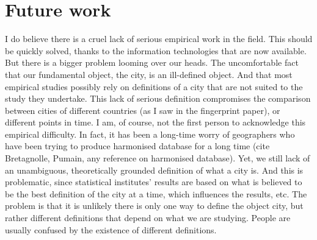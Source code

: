 \section{Future work}
\label{sec:future_work}

I do believe there is a cruel lack of serious empirical work in the field. This
should be quickly solved, thanks to the information technologies that are now
available. But there is a bigger problem looming over our heads. The
uncomfortable fact that our fundamental object, the city, is an ill-defined
object. And that most empirical studies possibly rely on definitions of a city
that are not suited to the study they undertake. 
This lack of serious definition compromises the comparison between cities of
different countries (as I saw in the fingerprint paper), or different points in
time. I am, of course, not the first person to acknowledge this empirical
difficulty. In fact, it has been a long-time worry of geographers who have been
trying to produce harmonised database for a long time (cite
Bretagnolle, Pumain, any reference on harmonised database). Yet, we still lack
of an unambiguous, theoretically grounded definition of what a city is. And this
is problematic, since statistical institutes' results are based on what is
believed to be the best definition of the city at a time, which influences the
results, etc.
The problem is that it is unlikely there is only one way to define the object
city, but rather different definitions that depend on what we are studying.
People are usually confused by the existence of different definitions.


